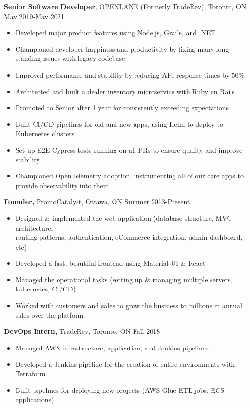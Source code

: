 \documentclass[line, centered]{res}
\begin{document}
\begin{resume}
	{\bf Senior Software Developer,} OPENLANE (Formerly TradeRev), Toronto, ON \hfill May 2019-May 2021\\[-8pt]
	\begin{itemize} \itemsep -1pt
		\item Developed major product features using Node.js, Grails, and .NET
		\item Championed developer happiness and productivity by fixing many long-standing issues with legacy codebase
		\item Improved performance and stability by reducing API response times by 50\%
		\item Architected and built a dealer inventory microservice with Ruby on Rails
		\item Promoted to Senior after 1 year for consistently exceeding expectations
		\item Built CI/CD pipelines for old and new apps, using Helm to deploy to Kubernetes clusters
		\item Set up E2E Cypress tests running on all PRs to ensure quality and improve stability
		\item Championed OpenTelemetry adoption, instrumenting all of our core apps to provide observability into them
	\end{itemize}

	{\bf Founder,} PromoCatalyst, Ottawa, ON \hfill Summer 2013-Present\\[-8pt]
	\begin{itemize} \itemsep -1pt
		\item Designed \& implemented the web application (database structure, MVC architecture,\\
		      routing patterns, authentication, eCommerce integration, admin dashboard, etc)
		\item Developed a fast, beautiful frontend using Material UI \& React
		\item Managed the operational tasks (setting up \& managing multiple servers, kubernetes, CI/CD)
		\item Worked with customers and sales to grow the business to millions in annual sales over the platform
	\end{itemize}


	{\bf DevOps Intern,} TradeRev, Toronto, ON \hfill Fall 2018\\[-8pt]
	\begin{itemize} \itemsep -1pt
		\item Managed AWS infrastructure, application, and Jenkins pipelines
		\item Developed a Jenkins pipeline for the creation of entire environments with Terraform
		\item Built pipelines for deploying new projects (AWS Glue ETL jobs, ECS applications)
	\end{itemize}


\end{resume}
\end{document}
